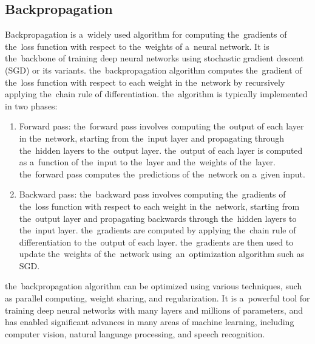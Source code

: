         \subsection{Backpropagation}\label{subsec:lp}
        Backpropagation is a~widely used algorithm for computing the~gradients of the~loss function with
        respect to the~weights of a~neural network. It is the~backbone of training deep neural networks using
        stochastic gradient descent (SGD) or its variants.
        the~backpropagation algorithm computes the~gradient of the~loss function with respect to each
        weight in the~network by recursively applying the~chain rule of differentiation.
        the~algorithm is typically implemented in two phases:
        \begin{enumerate}
            \item Forward pass: the~forward pass involves computing the~output of each layer in the~network,
            starting from the~input layer and propagating through the~hidden layers to the~output layer.
            the~output of each layer is computed as a~function of the~input to the~layer and the~weights of the~layer.
            the~forward pass computes the~predictions of the~network on a~given input.
            \item Backward pass: the~backward pass involves computing the~gradients of the~loss function with
            respect to each weight in the~network, starting from the~output layer and propagating backwards
            through the~hidden layers to the~input layer. the~gradients are computed by applying the~chain rule of
            differentiation to the~output of each layer. the~gradients are then used to update the~weights of
            the~network using~an~optimization algorithm such as SGD.
        \end{enumerate}
        the~backpropagation algorithm can be optimized using various techniques, such as parallel computing, weight
        sharing, and regularization. It is a~powerful tool for training deep neural networks with many layers and
        millions of parameters, and has enabled significant advances in many areas of machine learning, including
        computer vision, natural language processing, and speech recognition.
